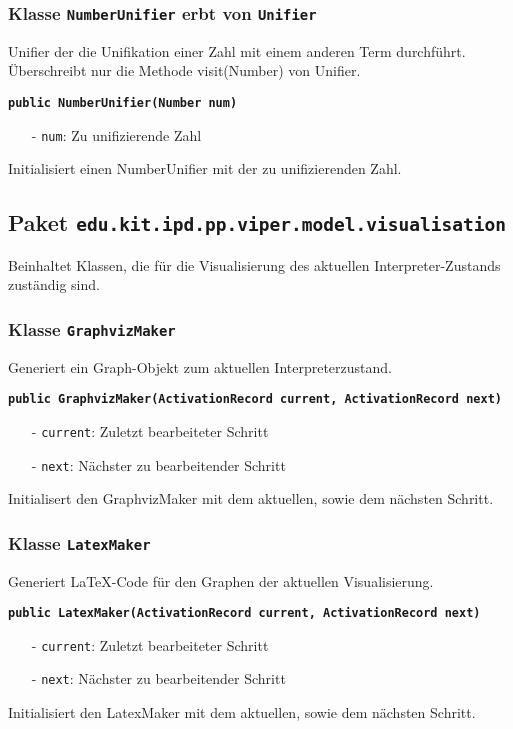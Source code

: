 \documentclass[parskip=full,11pt,twoside]{scrartcl}
\begin{document}
\subsubsection{Klasse \texttt{NumberUnifier} erbt von \texttt{Unifier}}

Unifier der die Unifikation einer Zahl mit einem anderen Term durchführt. Überschreibt nur die Methode visit(Number) von Unifier.

\textbf{\texttt{public NumberUnifier(Number num)}}
\begin{itemize}[noitemsep]
	\item[-] \texttt{num}: Zu unifizierende Zahl
\end{itemize}
Initialisiert einen NumberUnifier mit der zu unifizierenden Zahl.

\newpage
\subsection{Paket \texttt{edu.kit.ipd.pp.viper.model.visualisation}}

Beinhaltet Klassen, die für die Visualisierung des aktuellen Interpreter-Zustands zuständig sind.

\subsubsection{Klasse \texttt{GraphvizMaker}}

Generiert ein Graph-Objekt zum aktuellen Interpreterzustand.

\textbf{\texttt{public GraphvizMaker(ActivationRecord current, ActivationRecord next)}}
\begin{itemize}[noitemsep]
	\item[-] \texttt{current}: Zuletzt bearbeiteter Schritt
    \item[-] \texttt{next}: Nächster zu bearbeitender Schritt
\end{itemize}
Initialisert den GraphvizMaker mit dem aktuellen, sowie dem nächsten Schritt.

\subsubsection{Klasse \texttt{LatexMaker}}

Generiert LaTeX-Code für den Graphen der aktuellen Visualisierung.

\textbf{\texttt{public LatexMaker(ActivationRecord current, ActivationRecord next)}}
\begin{itemize}[noitemsep]
	\item[-] \texttt{current}: Zuletzt bearbeiteter Schritt
    \item[-] \texttt{next}: Nächster zu bearbeitender Schritt
\end{itemize}
Initialisiert den LatexMaker mit dem aktuellen, sowie dem nächsten Schritt.
\end{document}
